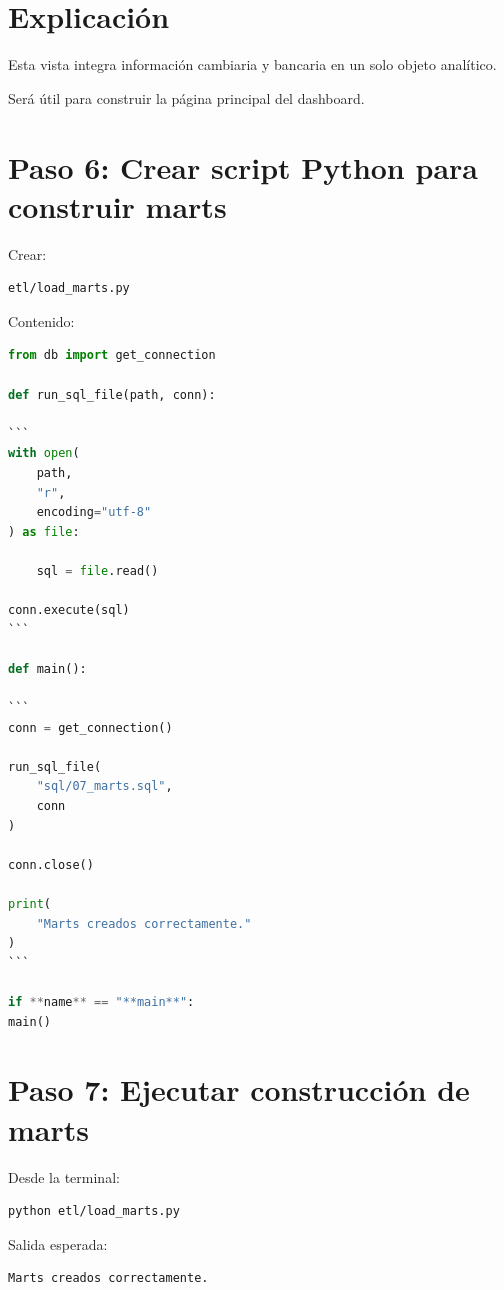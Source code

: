 \section{Explicación}

Esta vista integra información cambiaria y bancaria en un solo objeto analítico.

Será útil para construir la página principal del dashboard.

\section{Paso 6: Crear script Python para construir marts}

Crear:

\begin{verbatim}
etl/load_marts.py
\end{verbatim}

Contenido:

\begin{lstlisting}[language=Python]
from db import get_connection

def run_sql_file(path, conn):

```
with open(
    path,
    "r",
    encoding="utf-8"
) as file:

    sql = file.read()

conn.execute(sql)
```

def main():

```
conn = get_connection()

run_sql_file(
    "sql/07_marts.sql",
    conn
)

conn.close()

print(
    "Marts creados correctamente."
)
```

if **name** == "**main**":
main()
\end{lstlisting}

\section{Paso 7: Ejecutar construcción de marts}

Desde la terminal:

\begin{lstlisting}[language=bash]
python etl/load_marts.py
\end{lstlisting}

Salida esperada:

\begin{verbatim}
Marts creados correctamente.
\end{verbatim}

